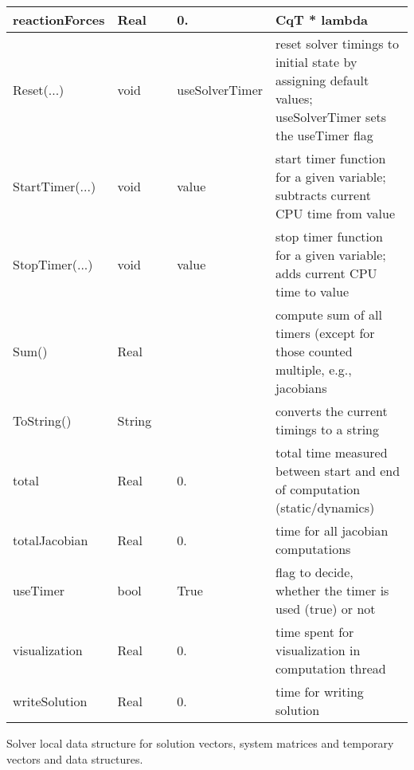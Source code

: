 \begin{center}
\begin{longtable}{| p{4.2cm} | p{2.5cm} | p{0.3cm} | p{3.0cm} | p{6cm} |}
    reactionForces &     Real &      &     0. &     CqT * lambda\\ \hline
    Reset(...) &     void &      &     useSolverTimer &     reset solver timings to initial state by assigning default values; useSolverTimer sets the useTimer flag\\ \hline
    StartTimer(...) &     void &      &     value &     start timer function for a given variable; subtracts current CPU time from value\\ \hline
    StopTimer(...) &     void &      &     value &     stop timer function for a given variable; adds current CPU time to value\\ \hline
    Sum() &     Real &      &      &     compute sum of all timers (except for those counted multiple, e.g., jacobians\\ \hline
    ToString() &     String &      &      &     converts the current timings to a string\\ \hline
    total &     Real &      &     0. &     total time measured between start and end of computation (static/dynamics)\\ \hline
    totalJacobian &     Real &      &     0. &     time for all jacobian computations\\ \hline
    useTimer &     bool &      &     True &     flag to decide, whether the timer is used (true) or not\\ \hline
    visualization &     Real &      &     0. &     time spent for visualization in computation thread\\ \hline
    writeSolution &     Real &      &     0. &     time for writing solution\\ \hline
	  \end{longtable}
	\end{center}



\label{sec:SolverLocalData}
Solver local data structure for solution vectors, system matrices and temporary vectors and data structures.

